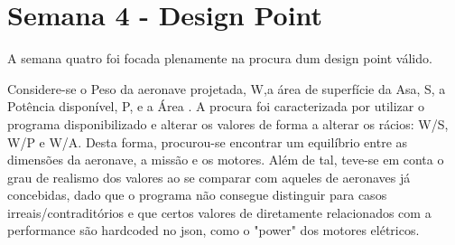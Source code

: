 \section{Semana 4 - Design Point}
A semana quatro foi focada plenamente na procura dum design point válido.\par
Considere-se o Peso da aeronave projetada, W,a área de superfície da Asa, S, a Potência disponível, P, e a Área . A procura foi caracterizada por utilizar o programa disponibilizado e alterar os valores de forma a alterar os rácios: W/S, W/P e W/A. Desta forma, procurou-se encontrar um equilíbrio entre as dimensões da aeronave, a missão e os motores. Além de tal, teve-se em conta o grau de realismo dos valores ao se comparar com aqueles de aeronaves já concebidas, dado que o programa não consegue distinguir para casos irreais/contraditórios e que certos valores de diretamente relacionados com a performance são hardcoded no json, como o "power" dos motores elétricos.\par
